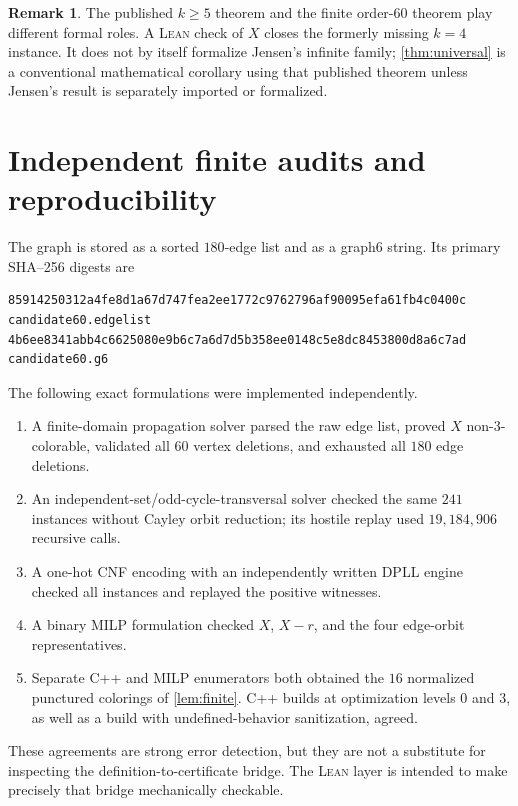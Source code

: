 \documentclass[10pt]{amsart}
\newcommand{\lean}{\textsc{Lean}}
\theoremstyle{definition}
\newtheorem{remark}[theorem]{Remark}
\begin{document}
\begin{remark}
The published $k\geq5$ theorem and the finite order-$60$ theorem play
different formal roles.  A \lean{} check of $X$ closes the formerly missing
$k=4$ instance.  It does not by itself formalize Jensen's infinite family;
\cref{thm:universal} is a conventional mathematical corollary using that
published theorem unless Jensen's result is separately imported or
formalized.
\end{remark}

\section{Independent finite audits and reproducibility}

The graph is stored as a sorted $180$-edge list and as a graph6 string.  Its
primary SHA--256 digests are
\begin{lstlisting}
85914250312a4fe8d1a67d747fea2ee1772c9762796af90095efa61fb4c0400c  candidate60.edgelist
4b6ee8341abb4c6625080e9b6c7a6d7d5b358ee0148c5e8dc8453800d8a6c7ad  candidate60.g6
\end{lstlisting}
The following exact formulations were implemented independently.
\begin{enumerate}[leftmargin=*]
\item A finite-domain propagation solver parsed the raw edge list, proved $X$
      non-$3$-colorable, validated all $60$ vertex deletions, and exhausted
      all $180$ edge deletions.
\item An independent-set/odd-cycle-transversal solver checked the same $241$
      instances without Cayley orbit reduction; its hostile replay used
      $19{,}184{,}906$ recursive calls.
\item A one-hot CNF encoding with an independently written DPLL engine checked
      all instances and replayed the positive witnesses.
\item A binary MILP formulation checked $X$, $X-r$, and the four edge-orbit
      representatives.
\item Separate C++ and MILP enumerators both obtained the $16$ normalized
      punctured colorings of \cref{lem:finite}.  C++ builds at optimization
      levels $0$ and $3$, as well as a build with undefined-behavior
      sanitization, agreed.
\end{enumerate}

These agreements are strong error detection, but they are not a substitute
for inspecting the definition-to-certificate bridge.  The \lean{} layer is
intended to make precisely that bridge mechanically checkable.
\end{document}
